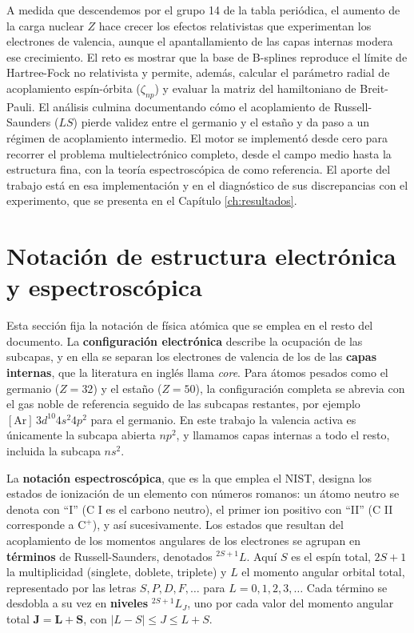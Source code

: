 A medida que descendemos por el grupo 14 de la tabla periódica, el aumento de la carga nuclear $Z$ hace crecer los efectos relativistas que experimentan los electrones de valencia, aunque el apantallamiento de las capas internas modera ese crecimiento. El reto es mostrar que la base de B-splines reproduce el límite de Hartree-Fock no relativista y permite, además, calcular el parámetro radial de acoplamiento espín-órbita ($\zeta_{np}$) y evaluar la matriz del hamiltoniano de Breit-Pauli. El análisis culmina documentando cómo el acoplamiento de Russell-Saunders ($LS$) pierde validez entre el germanio y el estaño y da paso a un régimen de acoplamiento intermedio. El motor se implementó desde cero para recorrer el problema multielectrónico completo, desde el campo medio hasta la estructura fina, con la teoría espectroscópica de \textcite{Cowan1981} como referencia. El aporte del trabajo está en esa implementación y en el diagnóstico de sus discrepancias con el experimento, que se presenta en el Capítulo \ref{ch:resultados}.

\section{Notación de estructura electrónica y espectroscópica}
\label{sec:notacion}

Esta sección fija la notación de física atómica que se emplea en el resto del documento. La \textbf{configuración electrónica} describe la ocupación de las subcapas, y en ella se separan los electrones de valencia de los de las \textbf{capas internas}, que la literatura en inglés llama \textit{core}. Para átomos pesados como el germanio ($Z=32$) y el estaño ($Z=50$), la configuración completa se abrevia con el gas noble de referencia seguido de las subcapas restantes, por ejemplo $[\text{Ar}]\, 3d^{10} 4s^2 4p^2$ para el germanio. En este trabajo la valencia activa es únicamente la subcapa abierta $np^2$, y llamamos capas internas a todo el resto, incluida la subcapa $ns^2$.

La \textbf{notación espectroscópica}, que es la que emplea el NIST, designa los estados de ionización de un elemento con números romanos: un átomo neutro se denota con ``I'' (C I es el carbono neutro), el primer ion positivo con ``II'' (C II corresponde a $\text{C}^+$), y así sucesivamente. Los estados que resultan del acoplamiento de los momentos angulares de los electrones se agrupan en \textbf{términos} de Russell-Saunders, denotados $^{2S+1}L$. Aquí $S$ es el espín total, $2S+1$ la multiplicidad (singlete, doblete, triplete) y $L$ el momento angular orbital total, representado por las letras $S, P, D, F, \dots$ para $L=0, 1, 2, 3, \dots$ Cada término se desdobla a su vez en \textbf{niveles} $^{2S+1}L_J$, uno por cada valor del momento angular total $\mathbf{J} = \mathbf{L} + \mathbf{S}$, con $|L-S| \le J \le L+S$.

